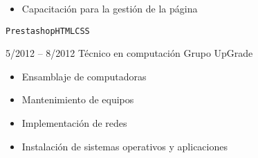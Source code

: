 \begin{entrylist}
{\begin{itemize}
		        \item Capacitación para la gestión de la página
		    \end{itemize}
		    \texttt{Prestashop}\slashsep\texttt{HTML}\slashsep\texttt{CSS}
        }
	\entry
		{5/2012 -- 8/2012}
		{Técnico en computación}
		{Grupo UpGrade}
    	{
    	    \vspace{-5mm}
    	    \begin{itemize}
    	        \setlength\itemsep{0pt}
    	        \setlength\parskip{0pt}
    	        \item Ensamblaje de computadoras
    	        \item Mantenimiento de equipos
    	        \item Implementación de redes
    	        \item Instalación de sistemas operativos y aplicaciones
    	    \end{itemize}
        }
\end{entrylist}